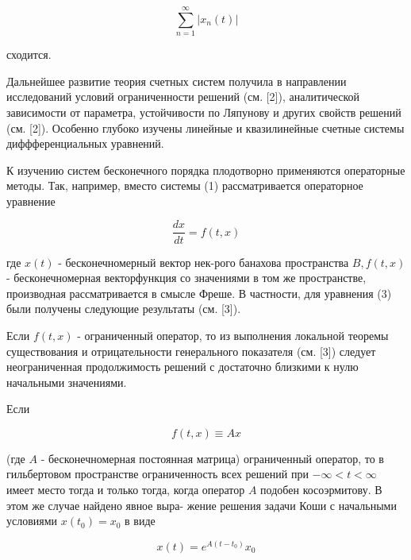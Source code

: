 \documentclass[10pt]{article}
\begin{document}
\[

\sum_{n=1}^{\infty}\left|x_{n}(t)\right|

\]



сходится.



Дальнейшее развитие теория счетных систем получила в направлении исследований условий ограниченности решений (см. [2]), аналитической зависимости от параметра, устойчивости по Ляпунову и других свойств решений (см. [2]). Особенно глубоко изучены линейные и квазилинейные счетные системы диффференциальных уравнений.



К изучению систем бесконечного порядка плодотворно применяются операторные методы. Так, например, вместо системы (1) рассматривается операторное уравнение



\[

\frac{d x}{d t}=f(t, x)

\]



где $x(t)$ - бесконечномерный вектор нек-рого банахова пространства $B, f(t, x)$ - бесконечномерная векторфункция со значениями в том же пространстве, производная рассматривается в смысле Фреше. В частности, для уравнения (3) были получены следующие результаты (см. [3]).



Если $f(t, x)$ - ограниченный оператор, то из выполнения локальной теоремы существования и отрицательности генерального показателя (см. [3]) следует неограниченная продолжимость решений с достаточно близкими к нулю начальными значениями.



Если



\[

f(t, x) \equiv A x

\]



(где $A$ - бесконечномерная постоянная матрица) ограниченный оператор, то в гильбертовом пространстве ограниченность всех решений при $-\infty<t<\infty$ имеет место тогда и только тогда, когда оператор $A$ подобен косоэрмитову. В этом же случае найдено явное выра- жение решения задачи Коши с начальными условиями $x\left(t_{0}\right)=x_{0}$ в виде



\[

x(t)=e^{A\left(t-t_{0}\right)} x_{0}

\]
\end{document}
